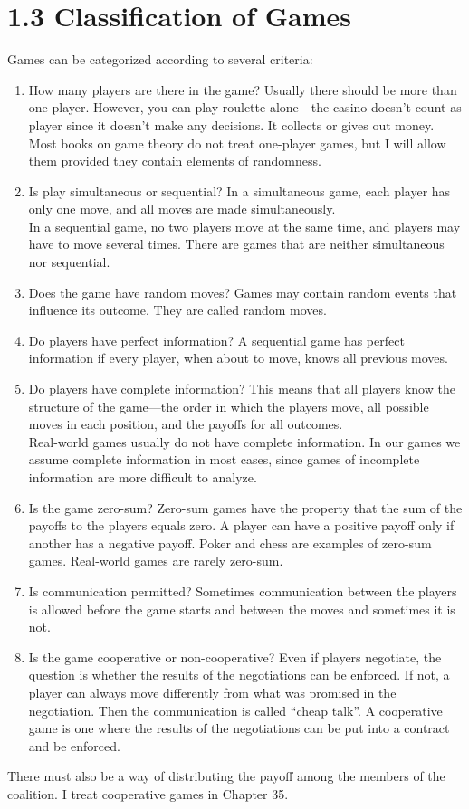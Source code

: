 \documentclass[11pt]{article} %
\begin{document}
\section*{1.3 Classification of Games}
Games can be categorized according to several criteria:
\begin{enumerate}
    \item 
How many players are there in the game? Usually there should be more than one player. However,
you can play roulette alone—the casino doesn’t count as player since it doesn’t make any decisions. It
collects or gives out money. Most books on game theory do not treat one-player games, but I will allow
them provided they contain elements of randomness.
\item Is play simultaneous or sequential? In a simultaneous game, each player has only one move, and all
moves are made simultaneously. \\ In a sequential game, no two players move at the same time, and
players may have to move several times. There are games that are neither simultaneous nor sequential.
\item Does the game have random moves? Games may contain random events that influence its outcome. They
are called random moves.
\item Do players have perfect information? A sequential game has perfect information if every player, when
about to move, knows all previous moves.
\item Do players have complete information? This means that all players know the structure of the game—the
order in which the players move, all possible moves in each position, and the payoffs for all outcomes.\\

Real-world games usually do not have complete information. In our games we assume complete information
in most cases, since games of incomplete information are more difficult to analyze.
\item Is the game zero-sum? Zero-sum games have the property that the sum of the payoffs to the players
equals zero. A player can have a positive payoff only if another has a negative payoff. Poker and chess
are examples of zero-sum games. Real-world games are rarely zero-sum.
\item Is communication permitted? Sometimes communication between the players is allowed before the game
starts and between the moves and sometimes it is not.
\item Is the game cooperative or non-cooperative? Even if players negotiate, the question is whether the results
of the negotiations can be enforced. If not, a player can always move differently from what was promised
in the negotiation. Then the communication is called “cheap talk”. A cooperative game is one where
the results of the negotiations can be put into a contract and be enforced. 
\end{enumerate}
There must also be a way of
distributing the payoff among the members of the coalition. I treat cooperative games in Chapter 35.
\end{document}
